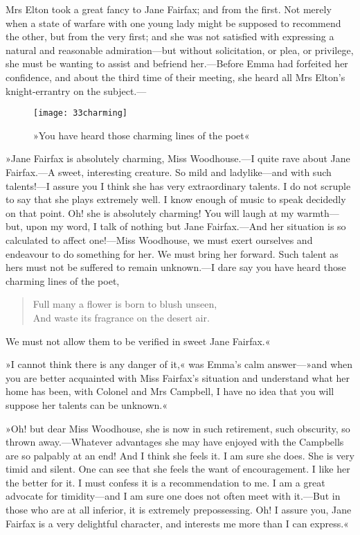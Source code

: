 Mrs Elton took a great fancy to Jane Fairfax; and from the first. Not merely when a state of warfare with one young lady might be supposed to recommend the other, but from the very first; and she was not satisfied with expressing a natural and reasonable admiration—but without solicitation, or plea, or privilege, she must be wanting to assist and befriend her.—Before Emma had forfeited her confidence, and about the third time of their meeting, she heard all Mrs Elton's knight-errantry on the subject.—

\begin{figure}[tbph]
\centering
\texttt{[image: 33charming]}
\caption{»You have heard those charming lines of the poet«}
\end{figure}

»Jane Fairfax is absolutely charming, Miss Woodhouse.—I quite rave about Jane Fairfax.—A sweet, interesting creature. So mild and ladylike—and with such talents!—I assure you I think she has very extraordinary talents. I do not scruple to say that she plays extremely well. I know enough of music to speak decidedly on that point. Oh! she is absolutely charming! You will laugh at my warmth—but, upon my word, I talk of nothing but Jane Fairfax.—And her situation is so calculated to affect one!—Miss Woodhouse, we must exert ourselves and endeavour to do something for her. We must bring her forward. Such talent as hers must not be suffered to remain unknown.—I dare say you have heard those charming lines of the poet,

\begin{verse}
Full many a flower is born to blush unseen,\\
    And waste its fragrance on the desert air.
\end{verse}

We must not allow them to be verified in sweet Jane Fairfax.«

»I cannot think there is any danger of it,« was Emma's calm answer—»and when you are better acquainted with Miss Fairfax's situation and understand what her home has been, with Colonel and Mrs Campbell, I have no idea that you will suppose her talents can be unknown.«

»Oh! but dear Miss Woodhouse, she is now in such retirement, such obscurity, so thrown away.—Whatever advantages she may have enjoyed with the Campbells are so palpably at an end! And I think she feels it. I am sure she does. She is very timid and silent. One can see that she feels the want of encouragement. I like her the better for it. I must confess it is a recommendation to me. I am a great advocate for timidity—and I am sure one does not often meet with it.—But in those who are at all inferior, it is extremely prepossessing. Oh! I assure you, Jane Fairfax is a very delightful character, and interests me more than I can express.«

